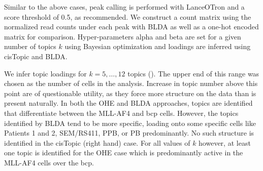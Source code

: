 Similar to the above cases, peak calling is performed with LanceOTron and a score threshold of 0.5, as recommended. We construct a count matrix using the normalized read counts under each peak with BLDA as well as a one-hot encoded matrix for comparison.  Hyper-parameters alpha and beta are set for a given number of topics $k$ using Bayesian optimization and loadings are inferred using cisTopic and BLDA. 

We infer topic loadings for $k=5,\ldots,12$ topics (). The upper end of this range was chosen as the number of cells in the analysis. Increase in topic number above this point are of questionable utility, as they force more structure on the data than is present naturally.  In both the OHE and BLDA approaches, topics are identified that differentiate between the MLL-AF4 and \gls{bcp} cells. However, the topics identified by BLDA tend to be more specific, loading onto some specific cells like Patients 1 and 2, SEM/RS411, PPB, or PB predominantly. No such structure is identified in the cisTopic (right hand) case. For all values of $k$ however, at least one topic is identified for the OHE case which is predominantly active in the MLL-AF4 cells over the \gls{bcp}.

